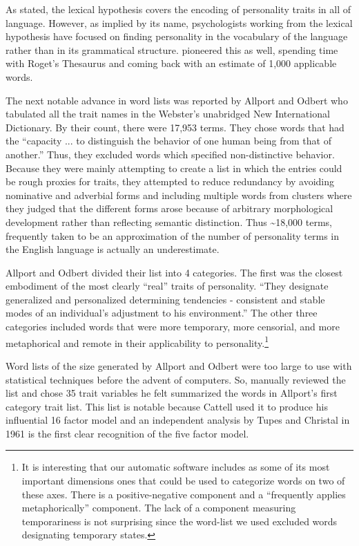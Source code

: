 As stated, the lexical hypothesis covers the encoding of personality traits in
all of language. However, as implied by its name, psychologists working from 
the lexical hypothesis have focused on finding personality in the vocabulary
of the language rather than in its grammatical structure. 
\citep[p. 181]{Galton1884} pioneered this
as well, spending time with Roget's Thesaurus and coming back with an estimate
of 1,000 applicable words.

The next notable advance in word lists was reported by Allport and Odbert 
\citep{Allport1936} who tabulated all the trait names in the
Webster's unabridged New International Dictionary. By their count, there were
17,953 terms. They chose words that had the ``capacity ... to distinguish 
the behavior of one human being from that of another.'' Thus, they excluded
words which specified non-distinctive behavior. Because they were
mainly attempting to create a list in which the entries could be rough proxies
for traits, they attempted to reduce redundancy by avoiding nominative and
adverbial forms and including multiple words from clusters where they judged 
that the different forms arose because of arbitrary morphological development 
rather than reflecting semantic distinction. Thus \textasciitilde 18,000 terms, frequently taken to 
be an approximation
of the number of personality terms in the English language is actually an
underestimate.

Allport and Odbert divided their list into 4 categories. The first was the
closest embodiment of the most clearly ``real'' traits of personality. ``They
designate generalized and personalized determining tendencies - consistent and
stable modes of an individual's adjustment to his environment.'' The other three
categories included words that were more temporary, more censorial, and more
metaphorical and remote in their applicability to personality.\footnote{ 
It is interesting that our automatic software includes as some of its most 
important dimensions ones that could be used to categorize words on two of these
axes.
There is a positive-negative component and a ``frequently applies metaphorically''
component. The lack of a component measuring temporariness is not surprising
since the word-list we used excluded words designating temporary states.}

Word lists of the size generated by Allport and Odbert were too large to use 
with statistical techniques before the advent of computers. So, 
\citep{Cattell1947} manually reviewed the list and chose 35 trait variables he felt
summarized the words in Allport's first category trait list. This list is
notable because Cattell used it to produce his influential 16 factor model
and an independent analysis by Tupes and Christal in 1961 \citep{Tupes1992} is 
the first clear recognition of the five factor model.

